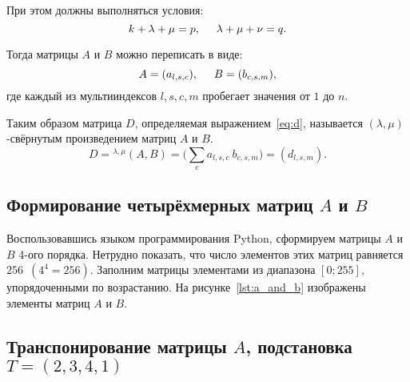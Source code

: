 При этом должны выполняться условия:
\[
  k + \lambda + \mu = p, \hspace{5mm} \lambda + \mu + \nu = q.
\]

Тогда матрицы $A$ и $B$ можно переписать в виде:
\[
  A = (a_{l,s,c}), \hspace{5mm} B = (b_{c,s,m}),
\]
где каждый из мультииндексов $l,s,c,m$ пробегает значения от $1$ до $n$.

Таким образом матрица $D$, определяемая выражением~\eqref{eq:d}, называется $(\lambda, \mu)$-свёрнутым
произведением матриц $A$ и $B$.
\begin{equation}
\label{eq:d}
  D = {}^{\lambda, \mu}(A, B) = \Big( \sum_c a_{l, s, c} \: b_{c, s, m} \Big) = (d_{l,s,m}).
\end{equation}

\subsection{Формирование четырёхмерных матриц $A$ и $B$}

Воспользовавшись языком программирования Python, сформируем матрицы
$A$ и $B$ 4-ого порядка. Нетрудно показать, что число элементов этих
матриц равняется $256$~$(4^4 = 256)$. Заполним матрицы элементами
из диапазона $[0; 255]$, упорядоченными по возрастанию.
На рисунке~\ref{lst:a_and_b} изображены элементы матриц $A$ и $B$.



\subsection{Транспонирование матрицы $A$, подстановка $T = (2,3,4,1)$}

